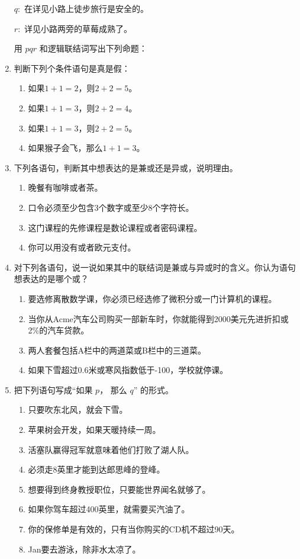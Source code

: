 \begin{enumerate}
		$q:$
		在详见小路上徒步旅行是安全的。

		$r:$
		详见小路两旁的草莓成熟了。

		用
		$pqr$
		和逻辑联结词写出下列命题：
	\item
		判断下列个条件语句是真是假：
		\begin{enumerate}
			\item	如果$1+1=2$，则$2+2=5$。
			\item	如果$1+1=3$，则$2+2=4$。
			\item	如果$1+1=3$，则$2+2=5$。
			\item	如果猴子会飞，那么$1+1=3$。
		\end{enumerate}
	\item
		下列各语句，判断其中想表达的是兼或还是异或，说明理由。
		\begin{enumerate}
			\item	晚餐有咖啡或者茶。
			\item	口令必须至少包含3个数字或至少8个字符长。
			\item	这门课程的先修课程是数论课程或者密码课程。
			\item	你可以用没有或者欧元支付。
		\end{enumerate}
	\item
		对下列各语句，说一说如果其中的联结词是兼或与异或时的含义。你认为语句想表达的是哪个或？
		\begin{enumerate}
			\item	要选修离散数学课，你必须已经选修了微积分或一门计算机的课程。
			\item	当你从Acme汽车公司购买一部新车时，你就能得到2000美元先进折扣或2\%的汽车贷款。
			\item	两人套餐包括A栏中的两道菜或B栏中的三道菜。
			\item	如果下雪超过0.6米或寒风指数低于-100，学校就停课。
		\end{enumerate}
	\item
		把下列语句写成“如果
		$p$，
		那么
		$q$”
		的形式。
		\begin{enumerate}
			\item	只要吹东北风，就会下雪。
			\item	苹果树会开发，如果天暖持续一周。
			\item	活塞队赢得冠军就意味着他们打败了湖人队。
			\item	必须走8英里才能到达郎思峰的登峰。
			\item	想要得到终身教授职位，只要能世界闻名就够了。
			\item	如果你驾车超过400英里，就需要买汽油了。
			\item	你的保修单是有效的，只有当你购买的CD机不超过90天。
			\item	Jan要去游泳，除非水太凉了。
		\end{enumerate}
\end{enumerate}
	